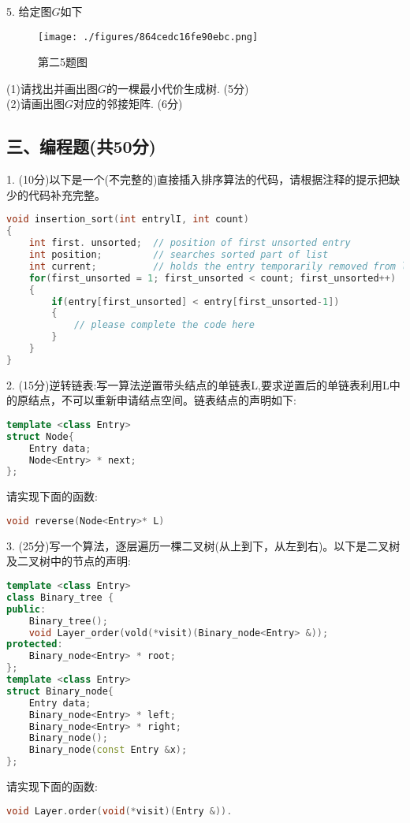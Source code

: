 5. 给定图$G$如下
\begin{figure}[ht]
\centering
\texttt{[image: ./figures/864cedc16fe90ebc.png]}
\caption{第二5题图} \label{fig_SYDS15_1}
\end{figure}
(1)请找出并画出图$G$的一棵最小代价生成树. (5分) \\
(2)请画出图$G$对应的邻接矩阵. (6分)

\subsection{三、编程题(共50分)}
1. (10分)以下是一个(不完整的)直接插入排序算法的代码，请根据注释的提示把缺少的代码补充完整。
\begin{lstlisting}[language=cpp]
void insertion_sort(int entrylI, int count)
{
    int first. unsorted;  // position of first unsorted entry
    int position;         // searches sorted part of list
    int current;          // holds the entry temporarily removed from list
    for(first_unsorted = 1; first_unsorted < count; first_unsorted++)
    {
        if(entry[first_unsorted] < entry[first_unsorted-1])
        {
            // please complete the code here
        }
    }
}
\end{lstlisting}

2. (15分)逆转链表:写一算法逆置带头结点的单链表L,要求逆置后的单链表利用L中的原结点，不可以重新申请结点空间。链表结点的声明如下:
\begin{lstlisting}[language=cpp]
template <class Entry>
struct Node{
    Entry data;
    Node<Entry> * next;
};
\end{lstlisting}
请实现下面的函数:
\begin{lstlisting}[language=cpp]
void reverse(Node<Entry>* L)
\end{lstlisting}

3. (25分)写一个算法，逐层遍历一棵二叉树(从上到下，从左到右)。以下是二叉树及二叉树中的节点的声明:
\begin{lstlisting}[language=cpp]
template <class Entry>
class Binary_tree {
public:
    Binary_tree();
    void Layer_order(vold(*visit)(Binary_node<Entry> &));
protected:
    Binary_node<Entry> * root;
};
template <class Entry>
struct Binary_node{
    Entry data;
    Binary_node<Entry> * left;
    Binary_node<Entry> * right;
    Binary_node();
    Binary_node(const Entry &x);
};
\end{lstlisting}
请实现下面的函数:
\begin{lstlisting}[language=cpp]
void Layer.order(void(*visit)(Entry &)).
\end{lstlisting}